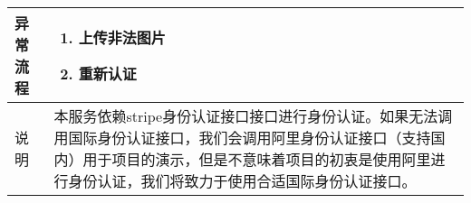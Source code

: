 \begin{table}[htbp]
\begin{tabular}{|l|l|l|l|}
        \hline
        异常流程                          & \multicolumn{3}{l|}{
            \begin{minipage}[t]{0.8\textwidth}
                \begin{enumerate}
                    \item 上传非法图片
                    \item 重新认证
                \end{enumerate}
                \vspace{.5em}
            \end{minipage}
        }                                                                                                                                                                            \\
        \hline
        说明                              & \multicolumn{3}{l|}{
        \begin{minipage}[t]{0.8\textwidth}
                本服务依赖stripe身份认证接口接口进行身份认证。如果无法调用国际身份认证接口，我们会调用阿里身份认证接口（支持国内）用于项目的演示，但是不意味着项目的初衷是使用阿里进行身份认证，我们将致力于使用合适国际身份认证接口。
                \vspace{.5em}
            \end{minipage} }                                                                                                                                                 \\
        \hline
    \end{tabular}
\end{table}


